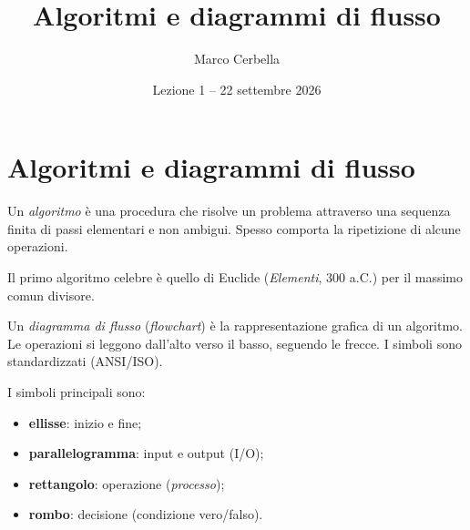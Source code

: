 \documentclass[11pt,a4paper]{article}
\title{Algoritmi e diagrammi di flusso}
\author{Marco Cerbella}
\date{Lezione 1 -- 22 settembre 2026}
\begin{document}
\maketitle

\section{Algoritmi e diagrammi di flusso}

\begin{definizione}
Un \emph{algoritmo} è una procedura che risolve un problema attraverso una
sequenza finita di passi elementari e non ambigui. Spesso comporta la
ripetizione di alcune operazioni.
\end{definizione}

\begin{esempio}
Il primo algoritmo celebre è quello di Euclide (\emph{Elementi}, 300 a.C.) per
il massimo comun divisore.
\end{esempio}

\begin{definizione}
Un \emph{diagramma di flusso} (\emph{flowchart}) è la rappresentazione grafica
di un algoritmo. Le operazioni si leggono dall'alto verso il basso, seguendo le
frecce. I simboli sono standardizzati (ANSI/ISO).
\end{definizione}

I simboli principali sono:
\begin{itemize}
    \item \textbf{ellisse}: inizio e fine;
    \item \textbf{parallelogramma}: input e output (I/O);
    \item \textbf{rettangolo}: operazione (\emph{processo});
    \item \textbf{rombo}: decisione (condizione vero/falso).
\end{itemize}

\begin{center}
\end{center}
\end{document}
